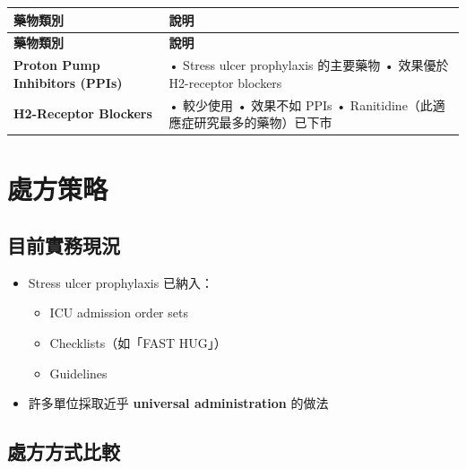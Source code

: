 \documentclass[12pt,a4paper]{article}
\begin{document}
\begin{longtable}{p{4cm}p{10cm}}
\toprule
\textbf{藥物類別} & \textbf{說明} \\
\midrule
\endfirsthead

\toprule
\textbf{藥物類別} & \textbf{說明} \\
\midrule
\endhead

\bottomrule
\endfoot

\textbf{Proton Pump Inhibitors (PPIs)} &
• Stress ulcer prophylaxis 的主要藥物\newline
• 效果優於 H2-receptor blockers \\
\midrule
\textbf{H2-Receptor Blockers} &
• 較少使用\newline
• 效果不如 PPIs\newline
• Ranitidine（此適應症研究最多的藥物）已下市 \\
\bottomrule
\end{longtable}

\section{處方策略}

\subsection{目前實務現況}

\begin{itemize}
    \item Stress ulcer prophylaxis 已納入：
    \begin{itemize}
        \item ICU admission order sets
        \item Checklists（如「FAST HUG」）
        \item Guidelines
    \end{itemize}
    \item 許多單位採取近乎 \textbf{universal administration} 的做法
\end{itemize}

\subsection{處方方式比較}
\end{document}
